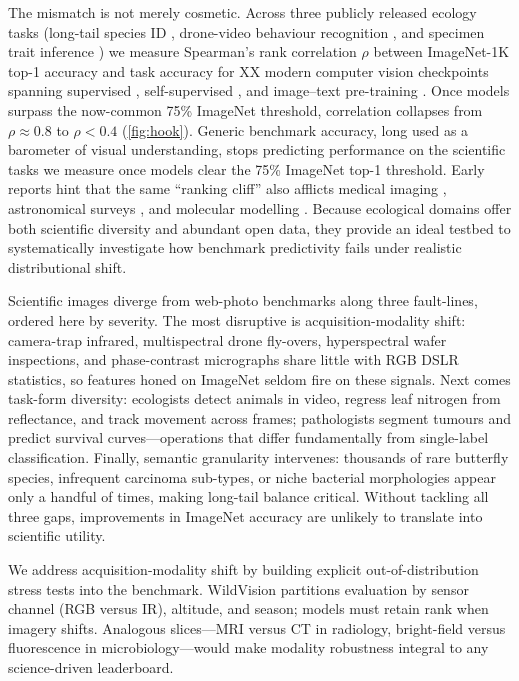 \documentclass{article}
\begin{document}
The mismatch is not merely cosmetic.  
Across three publicly released ecology tasks (long-tail species ID \citep{garcin2021plantnet300k}, drone-video behaviour recognition \citep{kholiavchenko2024kabr}, and specimen trait inference \citep{khan2023fishnet}) we measure Spearman's rank correlation $\rho$ between ImageNet-1K top-1 accuracy and task accuracy for XX modern computer vision checkpoints spanning supervised \citep{wrightmann2021rsb}, self-supervised \citep{dinov2}, and image–text pre-training \citep{clip,siglip,aimv2}.
Once models surpass the now-common \num{75}\% ImageNet threshold, correlation collapses from $\rho\approx0.8$ to $\rho<0.4$ (\cref{fig:hook}).
Generic benchmark accuracy, long used as a barometer of visual understanding, stops predicting performance on the scientific tasks we measure once models clear the 75\% ImageNet top-1 threshold.
Early reports hint that the same ``ranking cliff'' also afflicts medical imaging \citep{zech2018three,zeman2022deep}, astronomical surveys \citep{dominguez2023astronet}, and molecular modelling \citep{stark2023moleculebench}.
Because ecological domains offer both scientific diversity and abundant open data, they provide an ideal testbed to systematically investigate how benchmark predictivity fails under realistic distributional shift.

Scientific images diverge from web-photo benchmarks along three fault-lines, ordered here by severity. The most disruptive is acquisition-modality shift: camera-trap infrared, multispectral drone fly-overs, hyperspectral wafer inspections, and phase-contrast micrographs share little with RGB DSLR statistics, so features honed on ImageNet seldom fire on these signals. Next comes task-form diversity: ecologists detect animals in video, regress leaf nitrogen from reflectance, and track movement across frames; pathologists segment tumours and predict survival curves—operations that differ fundamentally from single-label classification. Finally, semantic granularity intervenes: thousands of rare butterfly species, infrequent carcinoma sub-types, or niche bacterial morphologies appear only a handful of times, making long-tail balance critical. Without tackling all three gaps, improvements in ImageNet accuracy are unlikely to translate into scientific utility.

We address acquisition-modality shift by building explicit out-of-distribution stress tests into the benchmark. WildVision partitions evaluation by sensor channel (RGB versus IR), altitude, and season; models must retain rank when imagery shifts. Analogous slices—MRI versus CT in radiology, bright-field versus fluorescence in microbiology—would make modality robustness integral to any science-driven leaderboard.
\end{document}
